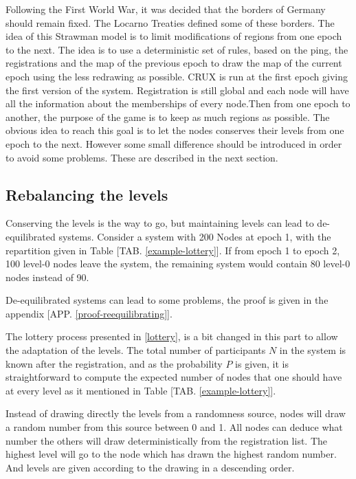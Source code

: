 \documentclass[a4paper,11pt,oneside]{report}
\begin{document}
Following the First World War, it was decided that the borders of Germany
should remain fixed. The Locarno Treaties defined some of these borders. The
idea of this Strawman model is to limit modifications of regions from one epoch
to the next. The idea is to use a deterministic set of rules, based on the
ping, the registrations and the map of the previous epoch to draw the map of
the current epoch using the less redrawing as possible. CRUX is run at the
first epoch giving the first version of the system. Registration is still
global and each node will have all the information about the memberships of
every node.Then from one epoch to another, the purpose of the game is to keep
as much regions as possible. The obvious idea to reach this goal is to let the
nodes conserves their levels from one epoch to the next.  However some small
difference should be introduced in order to avoid some problems.  These are
described in the next section.

\subsection{Rebalancing the levels} \label{rebalancing}
Conserving the levels is the way to go, but maintaining levels can lead to
de-equilibrated systems. Consider a system with 200 Nodes at epoch 1, with the
repartition given in Table [TAB. \autoref{example-lottery}]. If from epoch 1 to epoch 2,
100 level-0 nodes leave the system, the remaining system would contain 80
level-0 nodes instead of 90. 

De-equilibrated systems can lead to some problems, the proof is given in the
appendix [APP. \autoref{proof-reequilibrating}].

The lottery process presented in \autoref{lottery}, is a bit changed in
this part to allow the adaptation of the levels. The total number of
participants $N$ in the system is known after the registration, and as the
probability $P$ is given, it is straightforward to compute the expected number
of nodes that one should have at every level as it mentioned in Table [TAB. 
\autoref{example-lottery}]. 

Instead of drawing directly the levels from a randomness source, nodes will
draw a random number from this source between 0 and 1.  All nodes can deduce
what number the others will draw deterministically from the registration list.
The highest level will go to the node which has drawn the highest random
number.  And levels are given according to the drawing in a descending order.  
\end{document}
